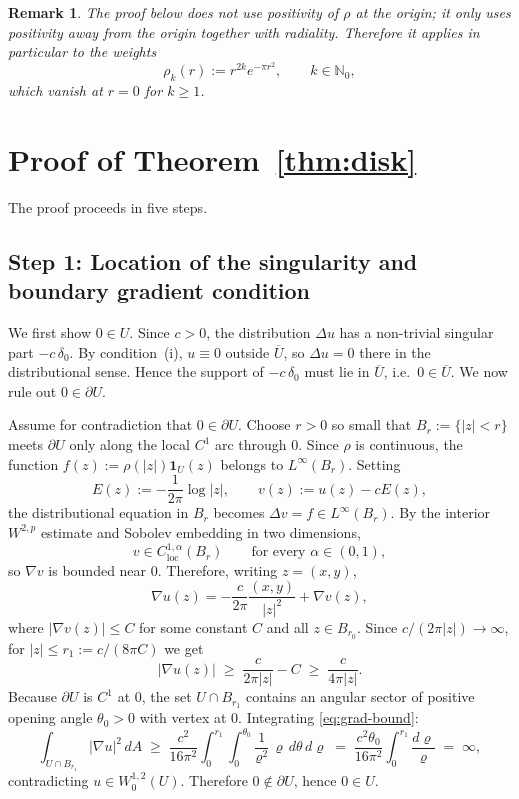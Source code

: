 \documentclass[11pt]{article}
\newtheorem{remark}[theorem]{Remark}
\newcommand{\1}{\mathbf{1}}
\begin{document}
\begin{remark}\label{rem:h0hk-weight}
  The proof below does not use positivity of $\rho$ at the origin; it only uses positivity away
  from the origin together with radiality.  Therefore it applies in particular to the weights
  \[
    \rho_k(r):=r^{2k}e^{-\pi r^2},
    \qquad k\in\mathbb N_0,
  \]
  which vanish at $r=0$ for $k\ge 1$.
\end{remark}

\section{Proof of Theorem~\ref{thm:disk}}

The proof proceeds in five steps.

\subsection*{Step 1: Location of the singularity and boundary gradient condition}

We first show $0\in U$.  Since $c>0$, the distribution $\Delta u$ has a non-trivial singular
part $-c\,\delta_0$.  By condition~(i), $u\equiv 0$ outside $\overline U$, so $\Delta u=0$
there in the distributional sense.  Hence the support of $-c\,\delta_0$ must lie in
$\overline{U}$, i.e.\ $0\in\overline{U}$.  We now rule out $0\in\partial U$.

Assume for contradiction that $0\in\partial U$.  Choose $r>0$ so small that $B_r:=\{|z|<r\}$
meets $\partial U$ only along the local $C^1$ arc through $0$.  Since $\rho$ is continuous, the
function $f(z):=\rho(|z|)\1_U(z)$ belongs to $L^\infty(B_r)$.  Setting
\[
  E(z):=-\frac{1}{2\pi}\log|z|, \qquad v(z):=u(z)-cE(z),
\]
the distributional equation in $B_r$ becomes $\Delta v=f\in L^\infty(B_r)$.  By the interior
$W^{2,p}$ estimate \cite[Theorem~9.11]{GilbargTrudinger} and Sobolev embedding in two
dimensions,
\[
  v\in C^{1,\alpha}_{\mathrm{loc}}(B_r) \qquad\text{for every }\alpha\in(0,1),
\]
so $\nabla v$ is bounded near $0$.  Therefore, writing $z=(x,y)$,
\begin{equation}\label{eq:singular-expansion}
  \nabla u(z) = -\frac{c}{2\pi}\frac{(x,y)}{|z|^2} + \nabla v(z),
\end{equation}
where $|\nabla v(z)|\le C$ for some constant $C$ and all $z\in B_{r_0}$.  Since
$c/(2\pi|z|)\to\infty$, for $|z|\le r_1:=c/(8\pi C)$ we get
\begin{equation}\label{eq:grad-bound}
  |\nabla u(z)| \;\ge\; \frac{c}{2\pi|z|} - C \;\ge\; \frac{c}{4\pi|z|}.
\end{equation}
Because $\partial U$ is $C^1$ at $0$, the set $U\cap B_{r_1}$ contains an angular sector of
positive opening angle $\theta_0>0$ with vertex at $0$.  Integrating \eqref{eq:grad-bound}:
\[
  \int_{U\cap B_{r_1}} |\nabla u|^2\,dA
  \;\ge\;
  \frac{c^2}{16\pi^2}\int_0^{r_1}\!\int_0^{\theta_0}
  \frac{1}{\varrho^2}\,\varrho\,d\theta\,d\varrho
  \;=\;
  \frac{c^2\theta_0}{16\pi^2}\int_0^{r_1}\frac{d\varrho}{\varrho}
  \;=\;\infty,
\]
contradicting $u\in W^{1,2}_0(U)$.  Therefore $0\notin\partial U$, hence $0\in U$.
\end{document}
